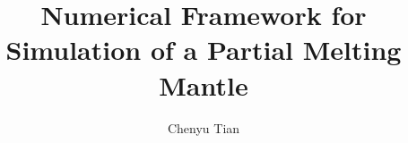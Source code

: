 \author{Chenyu Tian}  	%

\address{chenyu@ices.utexas.edu}  %

\title{Numerical Framework for Simulation of a Partial Melting Mantle} %


%
%
%
%
%
%

%
%
%
%
%
%


